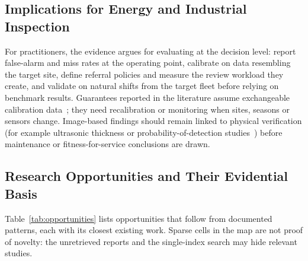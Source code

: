 \documentclass[journal]{IEEEtran}
\begin{document}
\subsection{Implications for Energy and Industrial Inspection}
For practitioners, the evidence argues for evaluating at the decision level: report false-alarm and miss rates at the operating point, calibrate on data resembling the target site, define referral policies and measure the review workload they create, and validate on natural shifts from the target fleet before relying on benchmark results. Guarantees reported in the literature assume exchangeable calibration data~\cite{deng2026distribution,yang2026saferestore}; they need recalibration or monitoring when sites, seasons or sensors change. Image-based findings should remain linked to physical verification (for example ultrasonic thickness or probability-of-detection studies~\cite{rintrawong2026coverage,kompanets2026evaluation}) before maintenance or fitness-for-service conclusions are drawn.

\subsection{Research Opportunities and Their Evidential Basis}
Table~\ref{tab:opportunities} lists opportunities that follow from documented patterns, each with its closest existing work. Sparse cells in the map are not proof of novelty: the \nNotRetrieved{} unretrieved reports and the single-index search may hide relevant studies.
\end{document}

